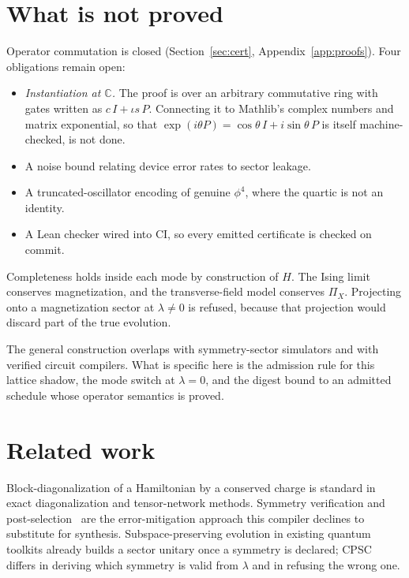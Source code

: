 \documentclass[11pt]{article}
\theoremstyle{definition}
\newcommand{\PiX}{\Pi_X}
\begin{document}
\section{What is not proved}
\label{sec:open}

Operator commutation is closed (Section~\ref{sec:cert}, Appendix~\ref{app:proofs}). Four obligations remain open:
\begin{itemize}[nosep]
  \item \emph{Instantiation at $\mathbb{C}$.} The proof is over an arbitrary commutative ring with gates written as $c\,I + \iota s\,P$. Connecting it to Mathlib's complex numbers and matrix exponential, so that $\exp(i\theta P) = \cos\theta\, I + i\sin\theta\, P$ is itself machine-checked, is not done.
  \item A noise bound relating device error rates to sector leakage.
  \item A truncated-oscillator encoding of genuine $\phi^4$, where the quartic is not an identity.
  \item A Lean checker wired into CI, so every emitted certificate is checked on commit.
\end{itemize}

Completeness holds inside each mode by construction of $H$. The Ising limit conserves magnetization, and the transverse-field model conserves $\PiX$. Projecting onto a magnetization sector at $\lambda \neq 0$ is refused, because that projection would discard part of the true evolution.

The general construction overlaps with symmetry-sector simulators and with verified circuit compilers. What is specific here is the admission rule for this lattice shadow, the mode switch at $\lambda = 0$, and the digest bound to an admitted schedule whose operator semantics is proved.

\section{Related work}

Block-diagonalization of a Hamiltonian by a conserved charge is standard in exact diagonalization and tensor-network methods. Symmetry verification and post-selection~\cite{bonetmonroig2018,sagastizabal2019} are the error-mitigation approach this compiler declines to substitute for synthesis. Subspace-preserving evolution in existing quantum toolkits already builds a sector unitary once a symmetry is declared; CPSC differs in deriving which symmetry is valid from $\lambda$ and in refusing the wrong one.
\end{document}

